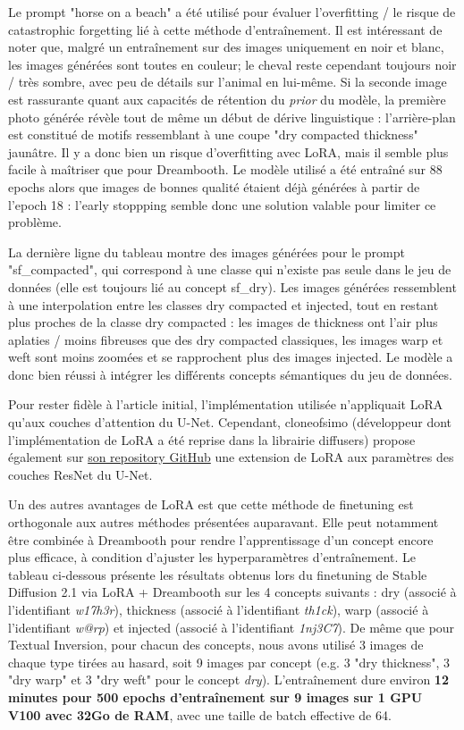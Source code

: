 \documentclass{article}
\begin{document}
Le prompt "horse on a beach" a été utilisé pour évaluer l'overfitting / le risque de catastrophic forgetting lié à cette méthode d'entraînement. Il est intéressant de noter que, malgré un entraînement sur des images uniquement en noir et blanc, les images générées sont toutes en couleur; le cheval reste cependant toujours noir / très sombre, avec peu de détails sur l'animal en lui-même. Si la seconde image est rassurante quant aux capacités de rétention du \textit{prior} du modèle, la première photo générée révèle tout de même un début de dérive linguistique : l'arrière-plan est constitué de motifs ressemblant à une coupe "dry compacted thickness" jaunâtre. Il y a donc bien un risque d'overfitting avec LoRA, mais il semble plus facile à maîtriser que pour Dreambooth. Le modèle utilisé a été entraîné sur 88 epochs alors que images de bonnes qualité étaient déjà générées à partir de l'epoch 18 : l'early stoppping semble donc une solution valable pour limiter ce problème. \par
La dernière ligne du tableau montre des images générées pour le prompt "sf\_compacted", qui correspond à une classe qui n'existe pas seule dans le jeu de données (elle est toujours lié au concept sf\_dry). Les images générées ressemblent à une interpolation entre les classes dry compacted et injected, tout en restant plus proches de la classe dry compacted : les images de thickness ont l'air plus aplaties / moins fibreuses que des dry compacted classiques, les images warp et weft sont moins zoomées et se rapprochent plus des images injected. Le modèle a donc bien réussi à intégrer les différents concepts sémantiques du jeu de données. \par
Pour rester fidèle à l'article initial, l'implémentation utilisée n'appliquait LoRA qu'aux couches d'attention du U-Net. Cependant, cloneofsimo (développeur dont l'implémentation de LoRA a été reprise dans la librairie diffusers) propose également sur \href{https://github.com/cloneofsimo/lora}{son repository GitHub} une extension de LoRA aux paramètres des couches ResNet du U-Net.

Un des autres avantages de LoRA est que cette méthode de finetuning est orthogonale aux autres méthodes présentées auparavant. Elle peut notamment être combinée à Dreambooth pour rendre l'apprentissage d'un concept encore plus efficace, à condition d'ajuster les hyperparamètres d'entraînement. Le tableau ci-dessous présente les résultats obtenus lors du finetuning de Stable Diffusion 2.1 via LoRA  + Dreambooth sur les 4 concepts suivants : dry (associé à l'identifiant \textit{w17h3r}), thickness (associé à l'identifiant \textit{th1ck}), warp (associé à l'identifiant \textit{w@rp}) et injected (associé à l'identifiant \textit{1nj3C7}). De même que pour Textual Inversion, pour chacun des concepts, nous avons utilisé 3 images de chaque type tirées au hasard, soit 9 images par concept (e.g. 3 "dry thickness", 3 "dry warp" et 3 "dry weft" pour le concept \textit{dry}). L'entraînement dure environ \textbf{12 minutes pour 500 epochs d'entraînement sur 9 images sur 1 GPU V100 avec 32Go de RAM}, avec une taille de batch effective de 64.
\end{document}
